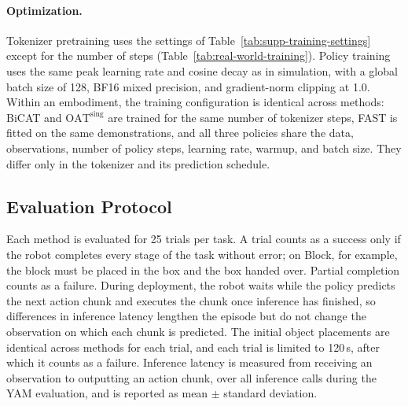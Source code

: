 \paragraph{Optimization.}
Tokenizer pretraining uses the settings of
Table~\ref{tab:supp-training-settings} except for the number of steps
(Table~\ref{tab:real-world-training}). Policy training uses the same
peak learning rate and cosine decay as in simulation, with a global batch
size of 128, BF16 mixed precision, and gradient-norm clipping at 1.0.
Within an embodiment, the training configuration is identical across
methods: BiCAT and $\mathrm{OAT}^{\mathrm{sing}}$ are trained for the same
number of tokenizer steps, FAST is fitted on the same demonstrations, and
all three policies share the data, observations, number of policy steps,
learning rate, warmup, and batch size. They differ only in the tokenizer
and its prediction schedule.

\subsection{Evaluation Protocol}
\label{app:real-world-eval}

Each method is evaluated for 25 trials per task. A trial counts as a
success only if the robot completes every stage of the task without error;
on Block, for example, the block must be placed in the box and the box
handed over. Partial completion counts as a failure. During deployment, the
robot waits while the policy predicts the next action chunk and executes
the chunk once inference has finished, so differences in inference latency
lengthen the episode but do not change the observation on which each chunk
is predicted. The initial object placements are identical across methods
for each trial, and each trial is limited to 120\,s, after which it counts
as a failure. Inference latency is measured from receiving an observation to outputting
an action chunk, over all inference calls during the YAM evaluation, and is
reported as mean $\pm$ standard deviation.

